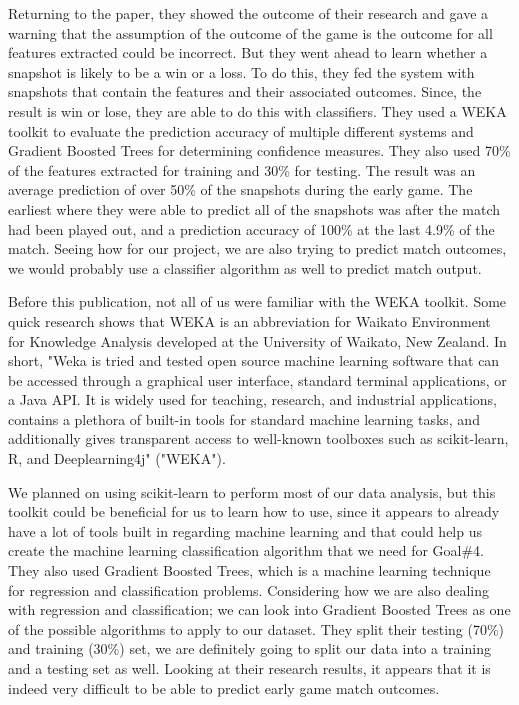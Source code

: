 \documentclass[a4paper,12pt]{report}
\begin{document}
Returning to the paper, they showed the outcome of their research and gave a warning that the assumption of the outcome of the game is the outcome for all features extracted could be incorrect. But they went ahead to learn whether a snapshot is likely to be a win or a loss. To do this, they fed the system with snapshots that contain the features and their associated outcomes. Since, the result is win or lose, they are able to do this with classifiers. They used a WEKA toolkit to evaluate the prediction accuracy of multiple different systems and Gradient Boosted Trees for determining confidence measures. They also used 70\% of the features extracted for training and 30\% for testing. The result was an average prediction of over 50\% of the snapshots during the early game. The earliest where they were able to predict all of the snapshots was after the match had been played out, and a prediction accuracy of 100\% at the last 4.9\% of the match.
Seeing how for our project, we are also trying to predict match outcomes, we would probably use a classifier algorithm as well to predict match output.

Before this publication, not all of us were familiar with the WEKA toolkit. Some quick research shows that WEKA is an abbreviation for Waikato Environment for Knowledge Analysis developed at the University of Waikato, New Zealand. In short, "Weka is tried and tested open source machine learning software that can be accessed through a graphical user interface, standard terminal applications, or a Java API. It is widely used for teaching, research, and industrial applications, contains a plethora of built-in tools for standard machine learning tasks, and additionally gives transparent access to well-known toolboxes such as scikit-learn, R, and Deeplearning4j" ("WEKA"). 

We planned on using scikit-learn to perform most of our data analysis, but this toolkit could be beneficial for us to learn how to use, since it appears to already have a lot of tools built in regarding machine learning and that could help us create the machine learning classification algorithm that we need for Goal\#4. They also used Gradient Boosted Trees, which is a machine learning technique for regression and classification problems. Considering how we are also dealing with regression and classification; we can look into Gradient Boosted Trees as one of the possible algorithms to apply to our dataset. They split their testing (70\%) and training (30\%) set, we are definitely going to split our data into a training and a testing set as well. Looking at their research results, it appears that it is indeed very difficult to be able to predict early game match outcomes.
\end{document}
